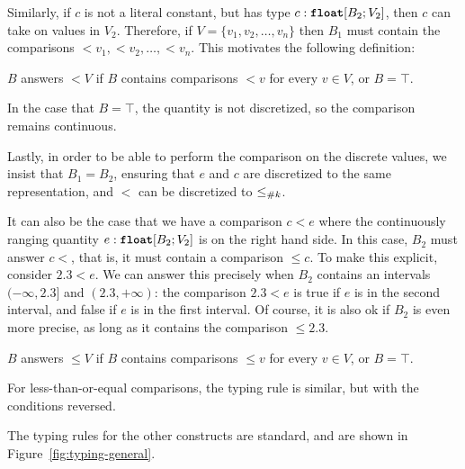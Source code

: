 Similarly, if $c$ is not a literal constant, but has type $c : \text{\ttfamily\bfseries float}[B_2; V_2]$, then $c$ can take on values in $V_2$. Therefore, if $V = \{v_1, v_2, \dots, v_n\}$ then $B_1$ must contain the comparisons $<\!\!v_1, <\!\!v_2, \dots, <\!\!v_n$. This motivates the following definition:

\begin{definition}
    \label{def:answers-less}
    $B$ answers $<\!\!V$ if $B$ contains comparisons $<\!\!v$ for every $v \in V$, or $B = \top$.
\end{definition}

In the case that $B = \top$, the quantity is not discretized, so the comparison remains continuous.

Lastly, in order to be able to perform the comparison on the discrete values, we insist that $B_1 = B_2$, ensuring that $e$ and $c$ are discretized to the same representation, and $<$ can be discretized to $\leq_{\#{k}}$.

It can also be the case that we have a comparison $c < e$ where the continuously ranging quantity $e : \text{\ttfamily\bfseries float}[B_2; V_2]$ is on the right hand side. In this case, $B_2$ must answer $c\!\!<$, that is, it must contain a comparison $\leq\!\!c$. To make this explicit, consider $2.3 < e$. We can answer this precisely when $B_2$ contains an intervals $(-\infty, 2.3]$ and $(2.3, +\infty)$: the comparison $2.3 < e$ is true if $e$ is in the second interval, and false if $e$ is in the first interval. Of course, it is also ok if $B_2$ is even more precise, as long as it contains the comparison $\leq\!\!2.3$.

\begin{definition}
    \label{def:answers-less-equal}
    $B$ answers $\leq\!\!V$ if $B$ contains comparisons $\leq\!\!v$ for every $v \in V$, or $B = \top$.
\end{definition}

For less-than-or-equal comparisons, the typing rule is similar, but with the conditions reversed.



The typing rules for the other constructs are standard, and are shown in Figure~\ref{fig:typing-general}.
